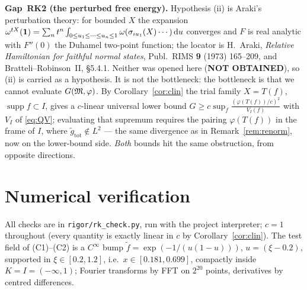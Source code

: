 \documentclass[11pt]{article}
\newcommand{\gtot}{g_{\mathrm{tot}}}\newcommand{\ktil}{\tilde k}
\newcommand{\supp}{\operatorname{supp}}\newcommand{\Ad}{\operatorname{Ad}}
\begin{document}
\begin{verdictgap}
\textbf{Gap~RK2 (the perturbed free energy).}  Hypothesis (ii) is Araki's perturbation theory: for bounded
$X$ the expansion $\omega^{tX}(\mathbf 1)=\sum_n t^n\int_{0\le u_1\le\cdots\le u_n\le1}
\omega(\sigma_{iu_1}(X)\cdots)\,\mathrm d u$ converges and $F$ is real analytic with
$F''(0)$ the Duhamel two-point function; the locator is H.~Araki, \emph{Relative Hamiltonian for faithful
normal states}, Publ.\ RIMS \textbf{9} (1973) 165--209, and Bratteli--Robinson~II, \S5.4.1.  Neither was
opened here (\textbf{NOT OBTAINED}), so (ii) is carried as a hypothesis.  It is not the bottleneck: the
bottleneck is that we cannot evaluate $G(\mathfrak M,\varphi)$.  By Corollary~\ref{cor:clin} the trial family
$X=T(f)$, $\supp f\subset I$, gives a $c$-linear universal lower bound
$G\ge c\sup_f\frac{(\varphi(T(f))/c)^2}{V_I(f)}$ with $V_I$ of \eqref{eq:QV}; evaluating that supremum
requires the pairing $\varphi(T(f))$ in the frame of $I$, where $\tilde\gtot\notin L^2$ --- the same
divergence as in Remark~\ref{rem:renorm}, now on the lower-bound side.  \emph{Both} bounds hit the same
obstruction, from opposite directions.
\end{verdictgap}

\section{Numerical verification}\label{sec:num}

All checks are in \texttt{rigor/rk\_check.py}, run with the project interpreter; $c=1$ throughout (every
quantity is exactly linear in $c$ by Corollary~\ref{cor:clin}).  The test field of (C1)--(C2) is a
$C^\infty$ bump $\tilde f=\exp(-1/(u(1-u)))$, $u=(\xi-0.2)$, supported in $\xi\in[0.2,1.2]$, i.e.\
$x\in[0.181,0.699]$, compactly inside $K=I=(-\infty,1)$; Fourier transforms by FFT on $2^{20}$ points,
derivatives by centred differences.
\end{document}
